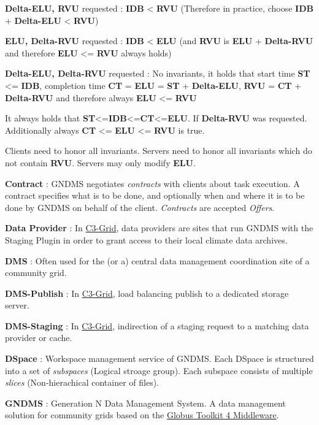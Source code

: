 \documentclass{article}
\begin{document}
\textbf{Delta-ELU, RVU} requested : \textbf{IDB} \textless{}
\textbf{RVU} (Therefore in practice, choose \textbf{IDB} +
\textbf{Delta-ELU} \textless{} \textbf{RVU})

\textbf{ELU, Delta-RVU} requested : \textbf{IDB} \textless{}
\textbf{ELU} (and \textbf{RVU} is \textbf{ELU} + \textbf{Delta-RVU}
and therefore \textbf{ELU} \textless{}= \textbf{RVU} always holds)

\textbf{Delta-ELU, Delta-RVU} requested : No invariants, it holds
that start time \textbf{ST} \textless{}= \textbf{IDB}, completion
time \textbf{CT} = \textbf{ELU} = \textbf{ST} + \textbf{Delta-ELU},
\textbf{RVU} = \textbf{CT} + \textbf{Delta-RVU} and therefore
always \textbf{ELU} \textless{}= \textbf{RVU}

It always holds that
\textbf{ST}\textless{}=\textbf{IDB}\textless{}=\textbf{CT}\textless{}=\textbf{ELU}.
If \textbf{Delta-RVU} was requested. Additionally always
\textbf{CT} \textless{}= \textbf{ELU} \textless{}= \textbf{RVU} is
true.

Clients need to honor all invariants. Servers need to honor all
invariants which do not contain \textbf{RVU}. Servers may only
modify \textbf{ELU}.

\textbf{Contract} : GNDMS negotiates \emph{contracts} with clients
about task execution. A contract specifies what is to be done, and
optionally when and where it is to be done by GNDMS on behalf of
the client. \emph{Contracts} are accepted \emph{Offers}.

\textbf{Data Provider} : In \href{http://www.c3grid.de}{C3-Grid},
data providers are sites that run GNDMS with the Staging Plugin in
order to grant access to their local climate data archives.

\textbf{DMS} : Often used for the (or a) central data management
coordination site of a community grid.

\textbf{DMS-Publish} : In \href{http://www.c3grid.de}{C3-Grid},
load balancing publish to a dedicated storage server.

\textbf{DMS-Staging} : In \href{http://www.c3grid.de}{C3-Grid},
indirection of a staging request to a matching data provider or
cache.

\textbf{DSpace} : Workspace management service of GNDMS. Each
DSpace is structured into a set of \emph{subspaces} (Logical
stroage group). Each subspace consists of multiple \emph{slices}
(Non-hierachical container of files).

\textbf{GNDMS} : Generation N Data Management System. A data
management solution for community grids based on the
\href{http://www.globus.orrg}{Globus Toolkit 4 Middleware}.
\end{document}
